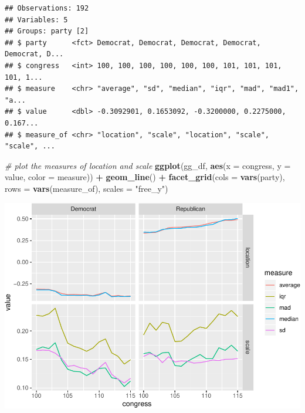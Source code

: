 \documentclass[]{book}
\newenvironment{Shaded}{\begin{snugshade}}{\end{snugshade}}
\newcommand{\CommentTok}[1]{\textcolor[rgb]{0.56,0.35,0.01}{\textit{#1}}}
\newcommand{\DataTypeTok}[1]{\textcolor[rgb]{0.13,0.29,0.53}{#1}}
\newcommand{\KeywordTok}[1]{\textcolor[rgb]{0.13,0.29,0.53}{\textbf{#1}}}
\newcommand{\NormalTok}[1]{#1}
\newcommand{\OperatorTok}[1]{\textcolor[rgb]{0.81,0.36,0.00}{\textbf{#1}}}
\newcommand{\StringTok}[1]{\textcolor[rgb]{0.31,0.60,0.02}{#1}}
\begin{document}
\begin{Shaded}
\end{Shaded}

\begin{verbatim}
## Observations: 192
## Variables: 5
## Groups: party [2]
## $ party      <fct> Democrat, Democrat, Democrat, Democrat, Democrat, D...
## $ congress   <int> 100, 100, 100, 100, 100, 100, 101, 101, 101, 101, 1...
## $ measure    <chr> "average", "sd", "median", "iqr", "mad", "mad1", "a...
## $ value      <dbl> -0.3092901, 0.1653092, -0.3200000, 0.2275000, 0.167...
## $ measure_of <chr> "location", "scale", "location", "scale", "scale", ...
\end{verbatim}

\begin{Shaded}
\begin{Highlighting}[]
\CommentTok{# plot the measures of location and scale}
\KeywordTok{ggplot}\NormalTok{(gg_df, }\KeywordTok{aes}\NormalTok{(}\DataTypeTok{x =}\NormalTok{ congress, }\DataTypeTok{y =}\NormalTok{ value, }\DataTypeTok{color =}\NormalTok{ measure)) }\OperatorTok{+}\StringTok{ }
\StringTok{  }\KeywordTok{geom_line}\NormalTok{() }\OperatorTok{+}\StringTok{ }
\StringTok{  }\KeywordTok{facet_grid}\NormalTok{(}\DataTypeTok{cols =} \KeywordTok{vars}\NormalTok{(party), }\DataTypeTok{rows =} \KeywordTok{vars}\NormalTok{(measure_of), }\DataTypeTok{scales =} \StringTok{"free_y"}\NormalTok{)}
\end{Highlighting}
\end{Shaded}

\includegraphics{concepts-and-computation_files/figure-latex/unnamed-chunk-13-1.pdf}
\end{document}
